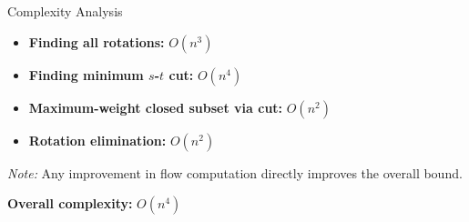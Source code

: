 \documentclass[aspectratio=169,xcolor=dvipsnames]{beamer}
\begin{document}


    
\begin{frame}{Complexity Analysis}
  \begin{itemize}
    \item \textbf{Finding all rotations:} \( O(n^3) \)
    \item \textbf{Finding minimum \( s \)-\( t \) cut:} \( O(n^4) \)
    \item \textbf{Maximum-weight closed subset via cut:} \( O(n^2) \)
    \item \textbf{Rotation elimination:} \( O(n^2) \)
  \end{itemize}

  \vspace{10pt}
  \textit{Note:} Any improvement in flow computation directly improves the overall bound.

  \vspace{10pt}
  \textbf{Overall complexity:} \( \boxed{O(n^4)} \)
\end{frame}
\end{document}
